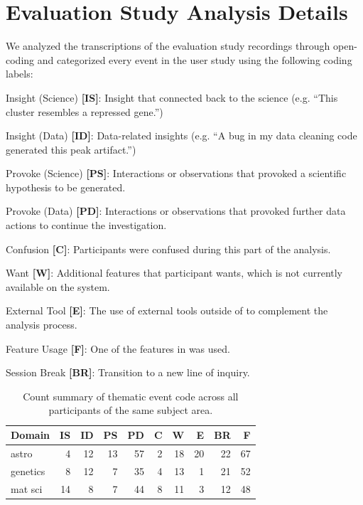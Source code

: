  \section{Evaluation Study Analysis Details\label{apdx:studydetails}}
 We analyzed the transcriptions of the evaluation study recordings through open-coding and
 categorized every event in the user study using the following coding labels:
 \begin{denselist}
     \item Insight (Science) \textbf{[IS]}: Insight that connected back to the science (e.g. ``This cluster resembles a repressed gene.'')
     \item Insight (Data) \textbf{[ID]}: Data-related insights (e.g. ``A bug in my data cleaning code generated this peak artifact.'')
     \item Provoke (Science) \textbf{[PS]}: Interactions or observations that provoked a scientific hypothesis to be generated.
     \item Provoke (Data) \textbf{[PD]}: Interactions or observations that provoked further data actions to continue the investigation.
     \item Confusion \textbf{[C]}: Participants were confused during this part of the analysis.
     \item Want \textbf{[W]}: Additional features that participant wants, which is not currently available on the system.
     \item External Tool \textbf{[E]}: The use of external tools outside of \zvpp to complement the analysis process.
     \item Feature Usage \textbf{[F]}: One of the features in \zvpp was used.
     \item Session Break \textbf{[BR]}: Transition to a new line of inquiry.
 \end{denselist}
 \begin{table}[h!]
   \begin{tabular}{lrrrrrrrrr}
   \hline
    Domain           &   IS &   ID &   PS &   PD &   C &   W &   E &   BR &   F \\
   \hline
    astro            &    4 &   12 &   13 &   57 &   2 &  18 &  20 &   22 &  67 \\
    genetics         &    8 &   12 &    7 &   35 &   4 &  13 &   1 &   21 &  52 \\
    mat sci          &   14 &    8 &    7 &   44 &   8 &  11 &   3 &   12 &  48 \\
   \hline
   \end{tabular}
   \caption{Count summary of thematic event code across all participants of the same subject area.}
 \end{table}
